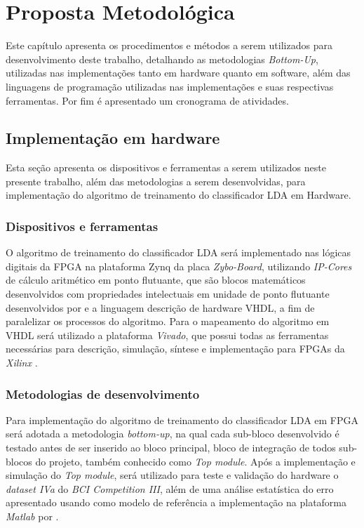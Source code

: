 \chapter[Proposta Metodológica]{Proposta Metodológica}
Este capítulo apresenta os procedimentos e métodos a serem utilizados para desenvolvimento deste
 trabalho, detalhando as metodologias \textit{Bottom-Up}, utilizadas nas implementações tanto em hardware
 quanto em software, além das linguagens de programação utilizadas nas implementações e suas respectivas
 ferramentas. Por fim é apresentado um cronograma de atividades.

\section{Implementação em hardware}
Esta seção apresenta os dispositivos e ferramentas a serem utilizados neste presente trabalho, além das metodologias a serem desenvolvidas, para implementação do algoritmo de treinamento do classificador LDA em Hardware.

\subsection{Dispositivos e ferramentas}
O algoritmo de treinamento do classificador LDA será implementado nas lógicas digitais da FPGA na plataforma Zynq da placa \textit{Zybo-Board}, utilizando \textit{IP-Cores} de cálculo aritmético em ponto flutuante, que são blocos matemáticos desenvolvidos com propriedades intelectuais \cite{munoz2010tradeoff} em unidade de ponto flutuante desenvolvidos por \cite{munoz2010tradeoff} e a linguagem descrição de hardware VHDL, a fim de paralelizar os processos do algoritmo. Para o mapeamento do algoritmo em VHDL será utilizado a plataforma \textit{Vivado}, que possui todas as ferramentas necessárias para descrição, simulação, síntese e implementação para FPGAs da \textit{Xilinx} \cite{zynqBook}.

\subsection{Metodologias de desenvolvimento}
Para implementação do algoritmo de treinamento do classificador LDA em FPGA será adotada a metodologia \textit{bottom-up}, na qual cada sub-bloco desenvolvido é testado antes de ser inserido ao bloco principal, bloco de integração de todos sub-blocos do projeto, também conhecido como \textit{Top module}.
Após a implementação e simulação do \textit{Top module}, será utilizado para teste e validação do hardware
 o \textit{dataset IVa} do \textit{BCI Competition III}, além de uma análise estatística do erro apresentado
usando como modelo de referência a implementação na plataforma \textit{Matlab} por \cite{F.Lotte}.


